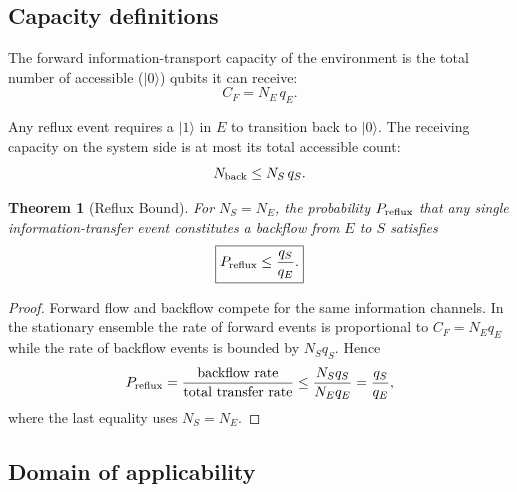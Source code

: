 \documentclass[aps,prd,twocolumn,superscriptaddress,nofootinbib,floatfix]{revtex4-2}
\newtheorem{theorem}{Theorem}[section]
\begin{document}
\subsection{Capacity definitions}

\begin{definition}
The forward information-transport capacity of the environment is the total
number of accessible ($|0\rangle$) qubits it can receive:
\begin{equation}
  C_F = N_E\,q_E.
  \label{eq:S1_CF}
\end{equation}
\end{definition}

\begin{definition}
Any reflux event requires a $|1\rangle$ in $E$ to transition back to
$|0\rangle$.  The receiving capacity on the system side is at most its total
accessible count:
\begin{equation}
  N_{\rm back} \le N_S\,q_S.
  \label{eq:S1_Nback}
\end{equation}
\end{definition}

\begin{theorem}[Reflux Bound]
\label{thm:reflux}
For $N_S = N_E$, the probability $P_{\rm reflux}$ that any single
information-transfer event constitutes a backflow from $E$ to $S$ satisfies
\begin{equation}
  \boxed{
  P_{\rm reflux} \le \frac{q_S}{q_E}.
  }
  \label{eq:S1_reflux_bound}
\end{equation}
\end{theorem}

\begin{proof}
Forward flow and backflow compete for the same information channels.
In the stationary ensemble the rate of forward events is proportional to
$C_F = N_E q_E$ while the rate of backflow events is bounded by
$N_S q_S$.  Hence
\begin{equation}
  P_{\rm reflux}
  = \frac{\text{backflow rate}}{\text{total transfer rate}}
  \le \frac{N_S q_S}{N_E q_E}
  = \frac{q_S}{q_E},
  \label{eq:S1_proof}
\end{equation}
where the last equality uses $N_S=N_E$.
\end{proof}

\subsection{Domain of applicability}
\end{document}
